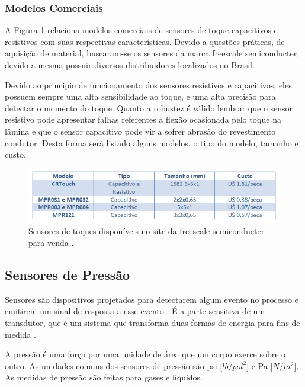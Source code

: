 \begin{anexosenv}
\subsubsection[Modelos Comerciais]{Modelos Comerciais}

A Figura \ref{fig15}  relaciona modelos comerciais de sensores de toque capacitivos e resistivos com suas respectivas características. Devido a questões práticas, de aquisição de material, buscaram-se os sensores da marca freescale semiconducter, devido a mesma possuir diversos distribuidores localizados no Brasil.
	
Devido ao principio de funcionamento dos sensores resistivos e capacitivos, eles possuem sempre uma alta sensibilidade ao toque, e uma alta precisão para detectar o momento do toque. Quanto a robustez é válido lembrar que o sensor resistivo pode apresentar falhas referentes a flexão ocasionada pelo toque na lâmina e que o sensor capacitivo pode vir a sofrer abrasão do revestimento condutor. Desta forma será listado alguns modelos, o tipo do modelo, tamanho e custo.

\begin{figure}[htb]
		\centering
			\includegraphics[scale=1.0]{figuras/toquecomerciais.png}
		\caption{Sensores de toques disponíveis no site da freescale semiconducter para venda \cite{free}.}
		\label{fig15}
\end{figure}


\subsection[Sensores de Pressão]{Sensores de Pressão}

Sensores são dispositivos projetados para detectarem algum evento no processo e emitirem um sinal de resposta a esse evento \cite{geomar}. É a parte sensitiva de um transdutor, que é um sistema que transforma duas formas de energia para fins de medida \cite{werneck}.

A pressão é uma força por uma unidade de área que um corpo exerce sobre o outro. As unidades comuns dos sensores de pressão são psi [$lb/pol^2$] e Pa [$N/m^2$]. As medidas de pressão são feitas para gases e líquidos.


\end{anexosenv}
